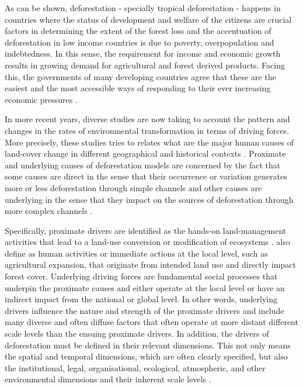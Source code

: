 As can be shown, deforestation - specially tropical deforestation - happens in countries where the status of development and welfare of the citizens are crucial factors in determining the extent of the forest loss and the accentuation of deforestation in low income countries is due to poverty, overpopulation and indebtedness. In this sense, the requirement for income and economic growth results in growing demand for agricultural and forest derived products. Facing this, the governments of many developing countries agree that these are the easiest and the most accessible ways of responding to their ever increasing economic pressures \citep{culas11}.

In more recent years, diverse studies are now taking to account the pattern and changes in the rates of environmental transformation in terms of driving forces. More precisely, these studies tries to relates what are the major human causes of land-cover change in different geographical and historical contexts \citep{GEIST}. Proximate and underlying causes of deforestation models are concerned by the fact that some causes are direct in the sense that their occurrence or variation generates more or less deforestation through simple channels and other causes are underlying in the sense that they impact on the sources of deforestation through more complex channels \citep{MOTEL}. 

Specifically, proximate drivers are identified as the hands-on land-management activities that  lead to a land-use conversion or modification of ecosystems \citep{LEEMANS}. \citet*{GEIST2} also define as human activities or immediate actions at the local level, such as agricultural expansion, that originate from intended land use and directly impact forest cover. Underlying driving forces are fundamental social processes that underpin the proximate causes and either operate at the local level or have an indirect impact from the national or global level. In other words, underlying drivers influence the nature and strength of the proximate drivers and include many diverse and often diffuse factors that often operate at more distant different scale levels than the ensuing proximate drivers. In addition, the drivers of deforestation must be defined in their relevant dimensions. This not only means the spatial and temporal dimensions, which are often clearly specified, but also the institutional, legal, organisational, ecological, atmospheric, and other environmental dimensions and their inherent scale levels \citep{LEEMANS}.

